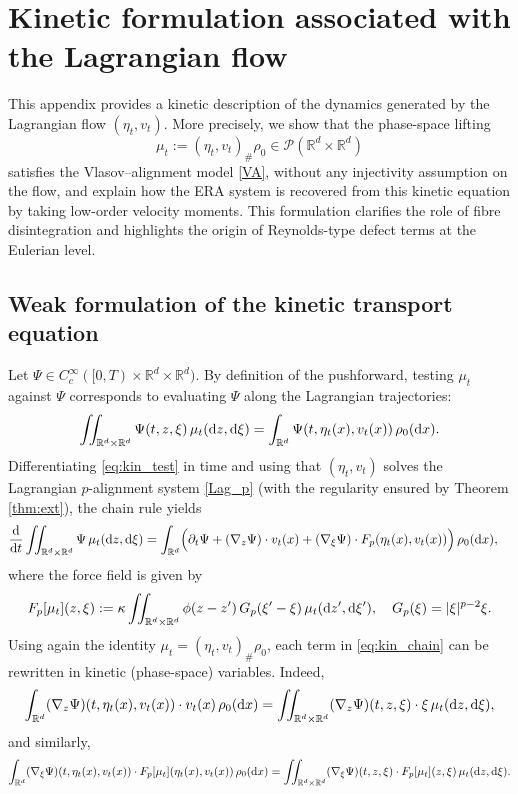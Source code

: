 \documentclass[10pt,reqno]{amsart}
\numberwithin{equation}{section}
\newcommand{\R}{\mathbb R}
\newcommand{\bq}{\begin{equation}}
\newcommand{\eq}{\end{equation}}
\newcommand{\pa}{\partial}
\newcommand{\intr}{\int_{\R^d}}
\newcommand{\intrr}{\iint_{\R^d \times \R^d}}
\newcommand{\calP}{\mathcal P}
\newcommand{\rd}{\textnormal{d}}
\newcommand{\dx}{\textnormal{d}x}
\newcommand{\dt}{\textnormal{d}t}
\newcommand{\dz}{\textnormal{d}z}
\begin{document}
%
%
%
%
 

\appendix

\section{Kinetic formulation associated with the Lagrangian flow}\label{app:kinetic}

This appendix provides a kinetic description of the dynamics generated by the Lagrangian flow $(\eta_t,v_t)$. More precisely, we show that the phase-space lifting
\[
\mu_t := (\eta_t,v_t)_\#\rho_0 \in \calP(\R^d\times\R^d)
\]
satisfies the Vlasov--alignment model \eqref{VA}, without any injectivity assumption on the flow, and explain how the ERA system is recovered from this kinetic equation by taking low-order velocity moments. This formulation clarifies the role of fibre disintegration and highlights the origin of Reynolds-type defect terms at the Eulerian level.
%
%
%
%
%
%
\subsection{Weak formulation of the kinetic transport equation}
Let $\Psi\in C_c^\infty([0,T)\times\R^d\times\R^d)$. By definition of the pushforward, testing $\mu_t$ against $\Psi$ corresponds to evaluating $\Psi$ along the Lagrangian trajectories:
\bq\label{eq:kin_test}
\intrr \Psi(t,z,\xi)\,\mu_t(\dz,\rd\xi)
= \intr \Psi(t,\eta_t(x),v_t(x))\,\rho_0(\dx).
\eq
Differentiating \eqref{eq:kin_test} in time and using that $(\eta_t,v_t)$ solves the Lagrangian $p$-alignment system \eqref{Lag_p} (with the regularity ensured by Theorem \ref{thm:ext}), the chain rule yields
\begin{align}\label{eq:kin_chain}
\frac{\rd}{\dt}\intrr \Psi\,\mu_t(\dz,\rd\xi)
&= \intr \Bigl(\pa_t\Psi + (\nabla_z\Psi)\cdot v_t(x)
      +(\nabla_\xi\Psi)\cdot F_p(\eta_t(x),v_t(x))\Bigr)\,\rho_0(\dx),
\end{align}
where the force field is given by
\[
F_p[\mu_t](z,\xi):=\kappa\intrr \phi(z-z')\,G_p(\xi'-\xi)\,\mu_t(\dz',\rd\xi'),
\quad G_p(\xi)=|\xi|^{p-2}\xi.
\]
Using again the identity $\mu_t=(\eta_t,v_t)_\#\rho_0$, each term in \eqref{eq:kin_chain} can be rewritten in kinetic (phase-space) variables. Indeed,
\[
\intr (\nabla_z\Psi)(t,\eta_t(x),v_t(x))\cdot v_t(x)\,\rho_0(\dx)
= \intrr (\nabla_z\Psi)(t,z,\xi)\cdot \xi\,\mu_t(\dz,\rd\xi),
\]
and similarly,
\[
\intr (\nabla_\xi\Psi)(t,\eta_t(x),v_t(x))\cdot F_p[\mu_t](\eta_t(x),v_t(x))\,\rho_0(\dx)
= \intrr (\nabla_\xi\Psi)(t,z,\xi)\cdot F_p[\mu_t](z,\xi)\,\mu_t(\dz,\rd\xi).
\]
\end{document}
